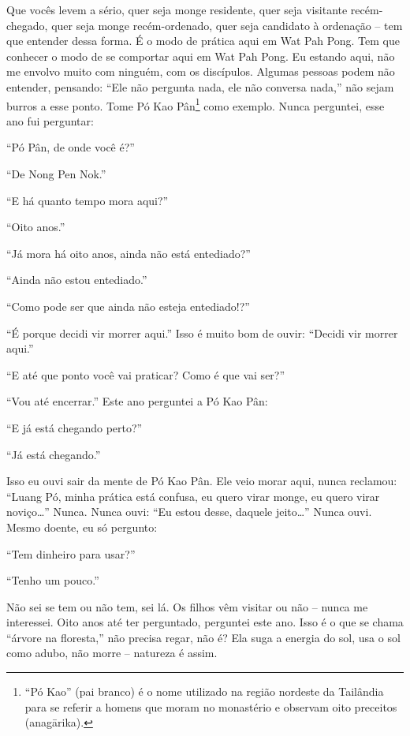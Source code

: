 Que vocês levem a sério, quer seja monge residente, quer seja
visitante recém-chegado, quer seja monge recém-ordenado, quer seja
candidato à ordenação – tem que entender dessa forma. É o modo de
prática aqui em Wat Pah Pong. Tem que conhecer o modo de se comportar
aqui em Wat Pah Pong. Eu estando aqui, não me envolvo muito com
ninguém, com os discípulos. Algumas pessoas podem não entender,
pensando: “Ele não pergunta nada, ele não conversa nada,” não sejam
burros a esse ponto. Tome Pó Kao Pân\footnote{“Pó Kao” (pai branco) é o
nome utilizado na região nordeste da Tailândia para se referir a homens
que moram no monastério e observam oito preceitos (anagārika).} como
exemplo. Nunca perguntei, esse ano fui perguntar: 

“Pó Pân, de onde você é?” 

“De Nong Pen Nok.”

“E há quanto tempo mora aqui?”

“Oito anos.” 

“Já mora há oito anos, ainda não está entediado?” 

“Ainda não estou entediado.”

“Como pode ser que ainda não esteja entediado!?”

“É porque decidi vir morrer aqui.” Isso é muito bom de ouvir:
“Decidi vir morrer aqui.” 

“E até que ponto você vai praticar? Como é que vai ser?”

“Vou até encerrar.” Este ano perguntei a Pó Kao Pân:

“E já está chegando perto?”

“Já está chegando.” 

Isso eu ouvi sair da mente de Pó Kao Pân. Ele veio morar aqui, nunca
reclamou: “Luang Pó, minha prática está confusa, eu quero virar monge,
eu quero virar noviço…” Nunca. Nunca ouvi: “Eu estou desse, daquele
jeito…” Nunca ouvi. Mesmo doente, eu só pergunto:

“Tem dinheiro para usar?” 

“Tenho um pouco.” 

Não sei se tem ou não tem, sei lá. Os filhos vêm visitar ou não –
nunca me interessei. Oito anos até ter perguntado, perguntei este ano.
Isso é o que se chama “árvore na floresta,” não precisa regar, não é?
Ela suga a energia do sol, usa o sol como adubo, não morre – natureza é
assim.
